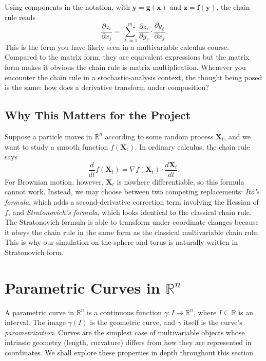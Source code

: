 \documentclass{article}
\begin{document}
Using components in the notation, with $\mathbf{y} = \mathbf{g}(\mathbf{x})$ and $\mathbf{z} = \mathbf{f}(\mathbf{y})$, the chain rule reads
$$\frac{\partial z_i}{\partial x_j} = \sum_{\ell = 1}^m \frac{\partial z_i}{\partial y_\ell} \cdot \frac{\partial y_\ell}{\partial x_j}.$$
This is the form you have likely seen in a multivariable calculus course. Compared to the matrix form, they are equivalent expressions but the matrix form makes it obvious the chain rule is matrix multiplication. Whenever you encounter the chain rule in a stochastic-analysis context, the thought being posed is the same: how does a derivative transform under composition?

\subsection{Why This Matters for the Project}

Suppose a particle moves in $\mathbb{R}^n$ according to some random process $\mathbf{X}_t$, and we want to study a smooth function $f(\mathbf{X}_t)$. In ordinary calculus, the chain rule says
$$\frac{d}{dt} f(\mathbf{X}_t) = \nabla f(\mathbf{X}_t) \cdot \frac{d\mathbf{X}_t}{dt}.$$
For Brownian motion, however, $\mathbf{X}_t$ is nowhere differentiable, so this formula cannot work. Instead, we may choose between two competing replacements: \textit{Itô's formula}, which adds a second-derivative correction term involving the Hessian of $f$, and \textit{Stratonovich's formula}, which looks identical to the classical chain rule. The Stratonovich formula is able to transform under coordinate changes because it obeys the chain rule in the same form as the classical multivariable chain rule. This is why our simulation on the sphere and torus is naturally written in Stratonovich form.

\section{Parametric Curves in $\mathbb{R}^n$}

A parametric curve in $\mathbb{R}^n$ is a continuous function $\gamma: I \to \mathbb{R}^n$, where $I \subseteq \mathbb{R}$ is an interval. The image $\gamma(I)$ is the geometric curve, and $\gamma$ itself is the curve's \textit{parametrization}. Curves are the simplest case of multivariable objects whose intrinsic geometry (length, curvature) differs from how they are represented in coordinates. We shall explore these properties in depth throughout this section
\end{document}
